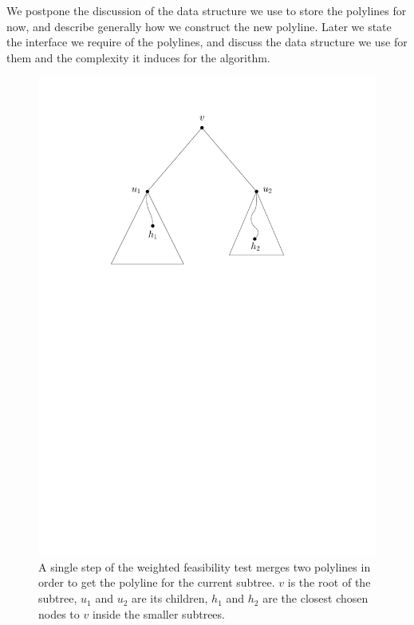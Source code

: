\documentclass[11pt,a4paper]{article}
\theoremstyle{definition}
\theoremstyle{remark}
\begin{document}
We postpone the discussion of the data structure we use to store the polylines for now, and describe generally how we construct the new polyline. Later we state the interface we require of the polylines, and discuss the data structure we use for them and the complexity it induces for the algorithm.

\begin{figure}[h]
\begin{center}
\includegraphics[scale=0.4]{polyline_step}
\end{center}
\caption{A single step of the weighted feasibility test merges two polylines in order to get the polyline for the current subtree. $v$ is the root of the subtree, $u_1$ and $u_2$ are its children, $h_1$ and $h_2$ are the closest chosen nodes to $v$ inside the smaller subtrees.
\label{figure of a single step of the weighted feasibility test}}
\end{figure}
\end{document}
